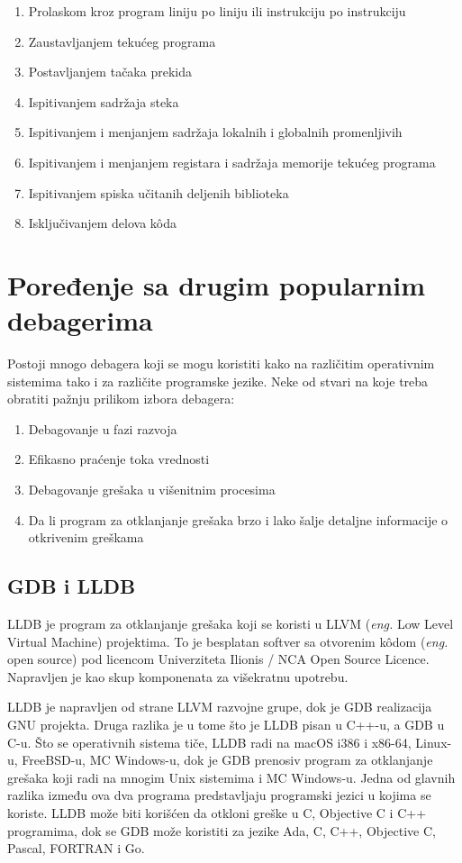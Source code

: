 \documentclass[a4paper]{article}
\begin{document}
\begin{enumerate}
\item Prolaskom kroz program liniju po liniju ili instrukciju po instrukciju
\item Zaustavljanjem tekućeg programa
\item Postavljanjem tačaka prekida
\item Ispitivanjem sadržaja steka
\item Ispitivanjem i menjanjem sadržaja lokalnih i globalnih promenljivih
\item Ispitivanjem i menjanjem registara i sadržaja memorije tekućeg programa
\item Ispitivanjem spiska učitanih deljenih biblioteka
\item Isključivanjem delova k\^{o}da
\end{enumerate}


\section{Poređenje sa drugim popularnim debagerima}
\label{sec:poredjenje}
Postoji mnogo debagera koji se mogu koristiti kako
na različitim operativnim sistemima tako i za različite programske jezike. 
Neke od stvari na koje treba obratiti pažnju prilikom izbora debagera\cite{tools}:

\begin{enumerate}
\item Debagovanje u fazi razvoja
\item Efikasno praćenje toka vrednosti
\item Debagovanje grešaka u višenitnim procesima
\item Da li program za otklanjanje grešaka brzo i lako šalje detaljne informacije o otkrivenim greškama
\end{enumerate}

\subsection{GDB i LLDB}
\label{subsec:lldb}
LLDB je program za otklanjanje grešaka koji se koristi u LLVM 
(\textit{eng.} Low Level Virtual Machine) projektima. To je besplatan softver sa 
otvorenim k\^{o}dom (\textit{eng.} open source) pod licencom 
Univerziteta Ilionis / NCA Open Source Licence. Napravljen je kao 
skup komponenata za višekratnu upotrebu\cite{lldb}. 

LLDB je napravljen od strane LLVM razvojne grupe, dok je GDB 
realizacija GNU projekta. Druga razlika je u tome što je LLDB 
pisan u C++-u, a GDB u C-u. Što se operativnih sistema tiče, LLDB 
radi na macOS i386 i x86-64, Linux-u,  FreeBSD-u, MC Windows-u, 
dok je GDB prenosiv program za otklanjanje grešaka koji radi na 
mnogim Unix sistemima i MC Windows-u. Jedna od glavnih razlika 
između ova dva programa predstavljaju programski jezici u kojima 
se koriste. LLDB može biti korišćen da otkloni greške u C, Objective 
C i C++ programima, dok se GDB može koristiti za jezike  Ada, C, 
C++, Objective C, Pascal, FORTRAN i Go.
\end{document}
